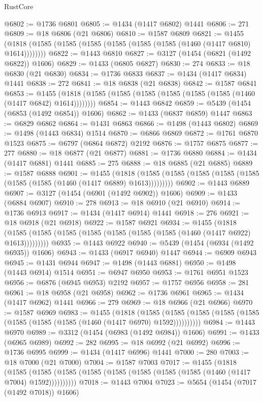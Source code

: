 \begin{lexlean}{RustCore}
\begin{coremodule}
@6802 := @1736 @6801
@6805 := @1434 (@1417 @6802) @1441
@6806 := 271
@6809 := @18 @6806 (@21 @6806)
@6810 := @1587 @6809
@6821 := @1455 (@1818 (@1585 (@1585 (@1585 (@1585 (@1585 (@1585 (@1460 (@1417 @6810) @1614))))))))
@6822 := @1443 @6810
@6827 := @3127 (@1454 (@6821 (@1492 @6822)) @1606)
@6829 := @1433 (@6805 @6827)
@6830 := 274
@6833 := @18 @6830 (@21 @6830)
@6834 := @1736 @6833
@6837 := @1434 (@1417 @6834) @1441
@6838 := 272
@6841 := @18 @6838 (@21 @6838)
@6842 := @1587 @6841
@6853 := @1455 (@1818 (@1585 (@1585 (@1585 (@1585 (@1585 (@1585 (@1460 (@1417 @6842) @1614))))))))
@6854 := @1443 @6842
@6859 := @5439 (@1454 (@6853 (@1492 @6854)) @1606)
@6862 := @1433 (@6837 @6859) @1447
@6863 := @6829 @6862
@6864 := @1431 @6863
@6866 := @1498 (@1443 @6802)
@6869 := @1498 (@1443 @6834) @1514
@6870 := @6866 @6869
@6872 := @1761 @6870 @1523
@6875 := @6797 (@6864 @6872) @2192
@6876 := @1757 @6875
@6877 := 277
@6880 := @18 @6877 (@21 @6877)
@6881 := @1736 @6880
@6884 := @1434 (@1417 @6881) @1441
@6885 := 275
@6888 := @18 @6885 (@21 @6885)
@6889 := @1587 @6888
@6901 := @1455
    (@1818 (@1585 (@1585 (@1585 (@1585 (@1585 (@1585 (@1585 (@1460 (@1417 @6889) @1613)))))))))
@6902 := @1443 @6889
@6907 := @3127 (@1454 (@6901 (@1492 @6902)) @1606)
@6909 := @1433 (@6884 @6907)
@6910 := 278
@6913 := @18 @6910 (@21 @6910)
@6914 := @1736 @6913
@6917 := @1434 (@1417 @6914) @1441
@6918 := 276
@6921 := @18 @6918 (@21 @6918)
@6922 := @1587 @6921
@6934 := @1455
    (@1818 (@1585 (@1585 (@1585 (@1585 (@1585 (@1585 (@1585 (@1460 (@1417 @6922) @1613)))))))))
@6935 := @1443 @6922
@6940 := @5439 (@1454 (@6934 (@1492 @6935)) @1606)
@6943 := @1433 (@6917 @6940) @1447
@6944 := @6909 @6943
@6945 := @1431 @6944
@6947 := @1498 (@1443 @6881)
@6950 := @1498 (@1443 @6914) @1514
@6951 := @6947 @6950
@6953 := @1761 @6951 @1523
@6956 := @6876 (@6945 @6953) @2192
@6957 := @1757 @6956
@6958 := 281
@6961 := @18 @6958 (@21 @6958)
@6962 := @1736 @6961
@6965 := @1434 (@1417 @6962) @1441
@6966 := 279
@6969 := @18 @6966 (@21 @6966)
@6970 := @1587 @6969
@6983 := @1455
    (@1818
      (@1585 (@1585 (@1585 (@1585 (@1585 (@1585 (@1585 (@1585 (@1460 (@1417 @6970) @1592))))))))))
@6984 := @1443 @6970
@6989 := @3312 (@1454 (@6983 (@1492 @6984)) @1606)
@6991 := @1433 (@6965 @6989)
@6992 := 282
@6995 := @18 @6992 (@21 @6992)
@6996 := @1736 @6995
@6999 := @1434 (@1417 @6996) @1441
@7000 := 280
@7003 := @18 @7000 (@21 @7000)
@7004 := @1587 @7003
@7017 := @1455
    (@1818
      (@1585 (@1585 (@1585 (@1585 (@1585 (@1585 (@1585 (@1585 (@1460 (@1417 @7004) @1592))))))))))
@7018 := @1443 @7004
@7023 := @5654 (@1454 (@7017 (@1492 @7018)) @1606)

\end{coremodule}
\end{lexlean}
